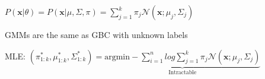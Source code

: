 \begin{center}
    $P(\boldsymbol{x}|\theta) = P(\boldsymbol{x}|\mu, \Sigma, \pi) = \sum_{j=1}^k \pi_j \mathcal{N}(\boldsymbol{x};\mu_j,\Sigma_j)$
\end{center}
GMMs are the same as GBC with unknown labels

MLE:
$(\pi_{1:k}^*,\mu_{1:k}^*,\Sigma_{1:k}^*) = \underbrace{\text{argmin}-\sum_{i=1}^n log \sum_{j=1}^k \pi_j \mathcal{N}(\boldsymbol{x};\mu_j,\Sigma_j)}_{\text{Intractable}}$

